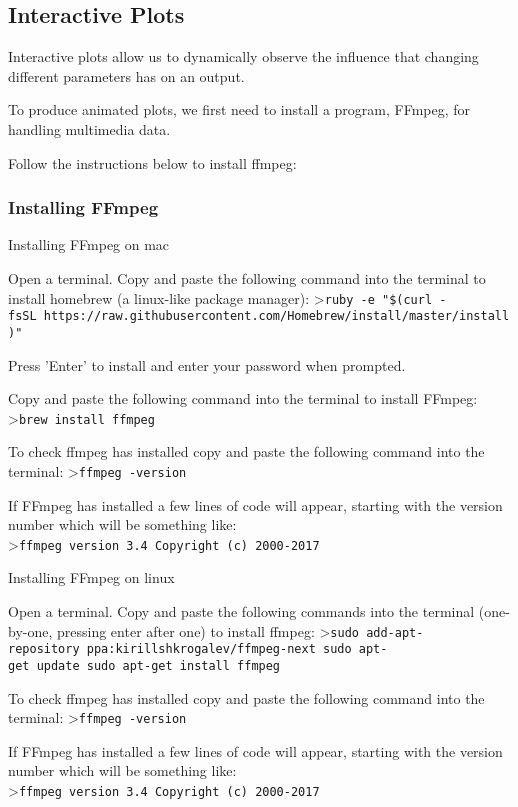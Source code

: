 \documentclass[11pt]{article}
\begin{document}
    \subsection{Interactive Plots}\label{interactive-plots}

 Interactive plots allow us to dynamically observe the influence that
changing different parameters has on an output.

To produce animated plots, we first need to install a program, FFmpeg,
for handling multimedia data.

Follow the instructions below to install ffmpeg:

    \subsubsection{Installing FFmpeg}\label{installing-ffmpeg}

    Installing FFmpeg on mac

Open a terminal. Copy and paste the following command into the terminal
to install homebrew (a linux-like package manager):
\textgreater{}\texttt{ruby\ -e\ "\$(curl\ -fsSL\ https://raw.githubusercontent.com/Homebrew/install/master/install)"}

Press 'Enter' to install and enter your password when prompted.

Copy and paste the following command into the terminal to install
FFmpeg: \textgreater{}\texttt{brew\ install\ ffmpeg}

To check ffmpeg has installed copy and paste the following command into
the terminal: \textgreater{}\texttt{ffmpeg\ -version}

If FFmpeg has installed a few lines of code will appear, starting with
the version number which will be something like:
\textgreater{}\texttt{ffmpeg\ version\ 3.4\ Copyright\ (c)\ 2000-2017}

    Installing FFmpeg on linux

Open a terminal. Copy and paste the following commands into the terminal
(one-by-one, pressing enter after one) to install ffmpeg:
\textgreater{}\texttt{sudo\ add-apt-repository\ ppa:kirillshkrogalev/ffmpeg-next\ sudo\ apt-get\ update\ sudo\ apt-get\ install\ ffmpeg}

To check ffmpeg has installed copy and paste the following command into
the terminal: \textgreater{}\texttt{ffmpeg\ -version}

If FFmpeg has installed a few lines of code will appear, starting with
the version number which will be something like:
\textgreater{}\texttt{ffmpeg\ version\ 3.4\ Copyright\ (c)\ 2000-2017}
\end{document}
